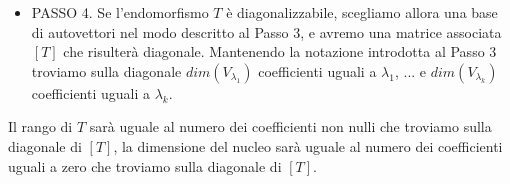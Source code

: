 \begin{itemize}
	      Osserviamo che abbiamo gi\`a un criterio per dire se $T$ \`e diagonalizzabile o no.
	      Ovvero, se
	      \begin{equation*}
		      dim(V_{\lambda_1}) + \cdots + dim(V_{\lambda_k}) = n = dim(V)
	      \end{equation*}
	      altrimenti se
	      \begin{equation*}
		      dim(V_{\lambda_1}) + \cdots + dim(V_{\lambda_k}) < n = dim(V)
	      \end{equation*}
	      $T$ non \`e diagonalizzabile. Infatti non \`e possibile trovare una base di
	      autovettori.
	\item PASSO 4. Se l'endomorfismo $T$ \`e diagonalizzabile, scegliamo allora una base di
	      autovettori nel modo descritto al Passo 3, e avremo una matrice associata $[T]$ che 
	      risulter\`a diagonale. Mantenendo la notazione introdotta al Passo 3 troviamo sulla
	      diagonale $dim(V_{\lambda_1})$ coefficienti uguali a 
	      $\lambda_1$, ... e $dim(V_{\lambda_k})$ coefficienti uguali a $\lambda_k$.
\end{itemize}
Il rango di $T$ sar\`a uguale al numero dei coefficienti non nulli che troviamo
sulla diagonale di $[T]$, la dimensione del nucleo sar\`a uguale al numero dei
coefficienti uguali a zero che troviamo sulla diagonale di $[T]$.

